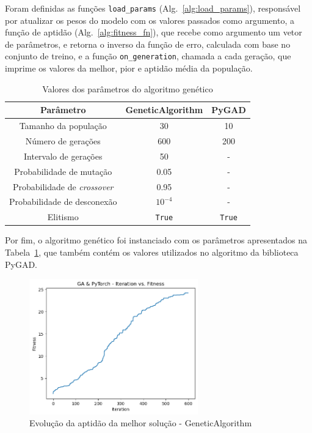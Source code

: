 Foram definidas as funções \texttt{load\_params} (Alg.~\ref{alg:load_params}), responsável por atualizar os pesos do modelo com os valores passados como argumento, a função de aptidão (Alg.~\ref{alg:fitness_fn}), que recebe como argumento um vetor de parâmetros, e retorna o inverso da função de erro, calculada com base no conjunto de treino, e a função \texttt{on\_generation}, chamada a cada geração, que imprime os valores da melhor, pior e aptidão média da população.

\begin{table}[htbp]
    \centering
    \begin{tabular}{ccc}
        \hline
        \textbf{Parâmetro} & \textbf{GeneticAlgorithm} & \textbf{PyGAD} \\
        \hline
        Tamanho da população & 30 & 10 \\
        Número de gerações & 600 & 200 \\
        Intervalo de gerações & 50 & - \\
        Probabilidade de mutação & 0.05 & - \\
        Probabilidade de \textit{crossover} & 0.95 & - \\
        Probabilidade de desconexão & $10^{-4}$ & - \\
        Elitismo & \texttt{True} & \texttt{True} \\
        \hline
    \end{tabular}
    \caption{Valores dos parâmetros do algoritmo genético}
    \label{tab:ga_param_values}
\end{table}

Por fim, o algoritmo genético foi instanciado com os parâmetros apresentados na Tabela~\ref{tab:ga_param_values}, que também contém os valores utilizados no algoritmo da biblioteca PyGAD\@.

\begin{figure}[htbp]
    \centering
    \includegraphics[width=0.65\textwidth]{images/ga_fitness}
    \caption{Evolução da aptidão da melhor solução - GeneticAlgorithm}
    \label{fig:ga_fitness}
\end{figure}


